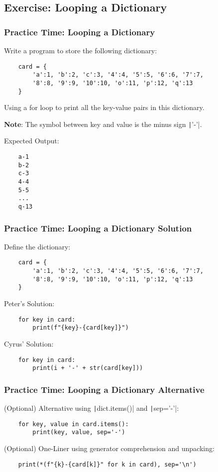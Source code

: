 \documentclass{beamer}
\begin{document}
\subsection{Exercise: Looping a Dictionary}
\begin{frame}[fragile]
    \frametitle{Practice Time: Looping a Dictionary}
    Write a program to store the following dictionary:
    \begin{verbatim}
    card = {
        'a':1, 'b':2, 'c':3, '4':4, '5':5, '6':6, '7':7,
        '8':8, '9':9, '10':10, 'o':11, 'p':12, 'q':13
    }
    \end{verbatim}
    Using a for loop to print all the key-value pairs in this dictionary.

    \textbf{Note}: The symbol between key and value is the minus sign \texttt|'-'|.

    Expected Output:
    \begin{verbatim}
    a-1
    b-2
    c-3
    4-4
    5-5
    ...
    q-13
    \end{verbatim}
\end{frame}
\begin{frame}[fragile]
    \frametitle{Practice Time: Looping a Dictionary Solution}

    Define the dictionary:
    \begin{verbatim}
    card = {
        'a':1, 'b':2, 'c':3, '4':4, '5':5, '6':6, '7':7,
        '8':8, '9':9, '10':10, 'o':11, 'p':12, 'q':13
    }
    \end{verbatim}

    Peter's Solution:
    \begin{verbatim}
    for key in card:
        print(f"{key}-{card[key]}")
    \end{verbatim}

    Cyrus' Solution:
    \begin{verbatim}
    for key in card:
        print(i + '-' + str(card[key]))
    \end{verbatim}
\end{frame}

\begin{frame}[fragile]
    \frametitle{Practice Time: Looping a Dictionary Alternative}
    (Optional) Alternative using \texttt|dict.items()| and \texttt|sep='-'|:
    \begin{verbatim}
    for key, value in card.items():
        print(key, value, sep='-')
    \end{verbatim}

    (Optional) One-Liner using generator comprehension and unpacking:
    \begin{verbatim}
    print(*(f"{k}-{card[k]}" for k in card), sep='\n')
    \end{verbatim}
\end{frame}
\end{document}
